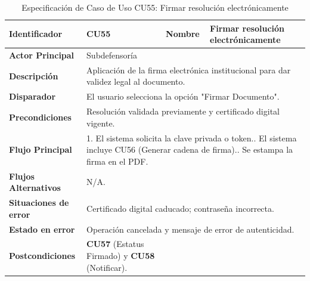 \begingroup
\setlength{\parskip}{0pt}
\begin{longtable}{|p{3.5cm}|p{2cm}|p{2.5cm}|p{7cm}|}
\caption{Especificación de Caso de Uso CU55: Firmar resolución electrónicamente}
\label{tab:cu55} \\
\hline
\textbf{Identificador} & CU55 & \textbf{Nombre} & Firmar resolución electrónicamente \\ \hline
\textbf{Actor Principal} & \multicolumn{3}{p{11.5cm}|}{Subdefensoría} \\ \hline
\textbf{Descripción} & \multicolumn{3}{p{11.5cm}|}{Aplicación de la firma electrónica institucional para dar validez legal al documento.} \\ \hline
\textbf{Disparador} & \multicolumn{3}{p{11.5cm}|}{El usuario selecciona la opción "Firmar Documento".} \\ \hline
\textbf{Precondiciones} & \multicolumn{3}{p{11.5cm}|}{Resolución validada previamente y certificado digital vigente.} \\ \hline
\textbf{Flujo Principal} & \multicolumn{3}{p{11.5cm}|}{1. El sistema solicita la clave privada o token.\newline 2. El sistema incluye CU56 (Generar cadena de firma).\newline 3. Se estampa la firma en el PDF.} \\ \hline
\textbf{Flujos Alternativos} & \multicolumn{3}{p{11.5cm}|}{N/A.} \\ \hline
\textbf{Situaciones de error} & \multicolumn{3}{p{11.5cm}|}{Certificado digital caducado; contraseña incorrecta.} \\ \hline
\textbf{Estado en error} & \multicolumn{3}{p{11.5cm}|}{Operación cancelada y mensaje de error de autenticidad.} \\ \hline
\textbf{Postcondiciones} & \textbf{CU57} (Estatus Firmado) y \textbf{CU58} (Notificar). \\ \hline
\end{longtable}
\endgroup

\vspace{0.8cm}

